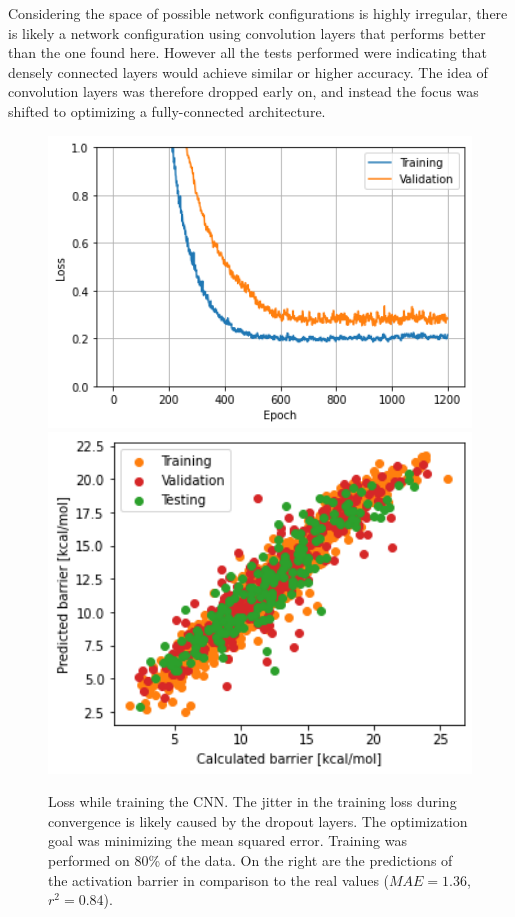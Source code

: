 Considering the space of possible network configurations is highly irregular, there is likely a network configuration using convolution layers 
that performs better than the one found here.
However all the tests performed were indicating that densely connected layers would achieve similar or higher accuracy.
The idea of convolution layers was therefore dropped early on, and instead the focus was shifted to optimizing a fully-connected architecture.
\\ 

\begin{figure}[!hb]
    \endminipage\hfill
      \includegraphics[width=1.0\textwidth]{figures/regression/fourier/cnn/lossCNN.png}
    \endminipage\hfill
      \includegraphics[width=1.0\textwidth]{figures/regression/fourier/cnn/scatterCNN.png}
    \endminipage\hfill
    \endminipage
    \caption[CNN trained on LEFD features]{
        Loss while training the CNN. The jitter in the training loss during convergence is likely caused by the dropout layers. 
        The optimization goal was minimizing the mean squared error. 
        Training was performed on 80\% of the data.
        On the right are the predictions of the activation barrier in comparison to the real values ($MAE=1.36$, $r^2=0.84$).
    }
    \label{fig:fourier_cnn}
\end{figure}

